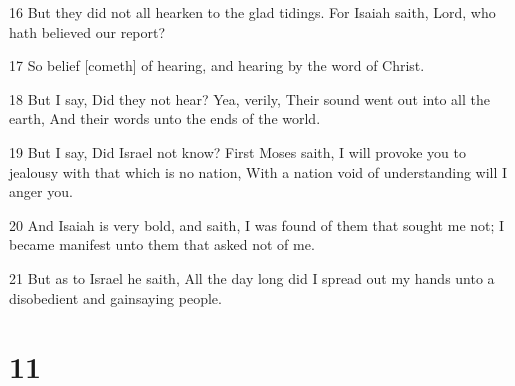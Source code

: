 \par 16 But they did not all hearken to the glad tidings. For Isaiah saith, Lord, who hath believed our report?
\par 17 So belief [cometh] of hearing, and hearing by the word of Christ.
\par 18 But I say, Did they not hear? Yea, verily, Their sound went out into all the earth, And their words unto the ends of the world.
\par 19 But I say, Did Israel not know? First Moses saith, I will provoke you to jealousy with that which is no nation, With a nation void of understanding will I anger you.
\par 20 And Isaiah is very bold, and saith, I was found of them that sought me not; I became manifest unto them that asked not of me.
\par 21 But as to Israel he saith, All the day long did I spread out my hands unto a disobedient and gainsaying people.

\chapter{11}

